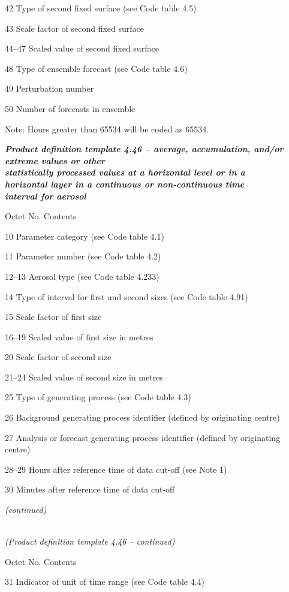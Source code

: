 42 Type of second fixed surface (see Code table 4.5)

43 Scale factor of second fixed surface

44--47 Scaled value of second fixed surface

48 Type of ensemble forecast (see Code table 4.6)

49 Perturbation number

50 Number of forecasts in ensemble

Note: Hours greater than 65534 will be coded as 65534.

\emph{\textbf{Product definition template 4.46 -- average, accumulation, and/or extreme values or other\\
statistically processed values at a horizontal level or in a\\
horizontal layer in a continuous or non-continuous time\\
interval for aerosol}}

Octet No. Contents

10 Parameter category (see Code table 4.1)

11 Parameter number (see Code table 4.2)

12--13 Aerosol type (see Code table 4.233)

14 Type of interval for first and second sizes (see Code table 4.91)

15 Scale factor of first size

16--19 Scaled value of first size in metres

20 Scale factor of second size

21--24 Scaled value of second size in metres

25 Type of generating process (see Code table 4.3)

26 Background generating process identifier (defined by originating centre)

27 Analysis or forecast generating process identifier (defined by originating centre)

28--29 Hours after reference time of data cut-off (see Note 1)

30 Minutes after reference time of data cut-off

\emph{(continued)}

\emph{\\
(Product definition template 4.46 -- continued)}

Octet No. Contents

31 Indicator of unit of time range (see Code table 4.4)


